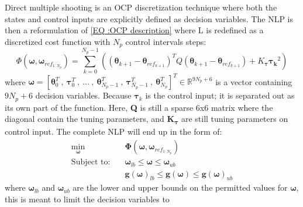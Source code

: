 Direct multiple shooting is an \gls{OCP} discretization technique where both the states and control inputs are explicitly defined as decision variables.
The \gls{NLP} is then a reformulation of \eqref{EQ :OCP description} where L is redefined as a discretized cost function with $N_p$ control intervals steps:
\begin{equation} %
    \Phi(\bm{\omega}, \bm{\omega}_{ref_{1:N_p}}) = 
    \sum_{k=0}^{N_{p}-1} ((\bm{\theta}_{k+1} - \bm{\theta}_{ref_{k+1}})^T Q (\bm{\theta}_{k+1} - \bm{\theta}_{ref_{k+1}}) + K_{\bm{\tau}} \bm{\tau_k}^2)
\end{equation}
where $\bm{\omega} = [\bm{\theta}_0^T \ , \ \bm{\tau}_0^T \ , \ ... \ , \ \bm{\theta}_{N_{p}-1}^T \ , \ \bm{\tau}_{N_{p}-1}^T \ , \ \bm{\theta}_{N_{p}}^T]^T \in \mathbb{R}^{9N_{p}+6}$
is a vector containing $9N_p + 6$ decision variables. %
Because $\bm{\tau}_k$ is the control input; it is separated out as its own part of the function. %
Here, \textbf{Q} is still a sparse 6x6 matrix where the diagonal contain the tuning parameters,
and \textbf{K}\textsubscript{$\bm{\tau}$} are still tuning parameters on control input. The complete NLP will end up in the form of:
\begin{subequations}
    \label{EQ:NLP}
    \begin{align}
        \min_{\bm{\omega}} \quad & \bm{\Phi}(\bm{\omega}, \bm{\omega}_{ref_{1:N_p}}) \\ %
        \textrm{Subject to:} \quad & \bm{\omega}_{lb} \leq \bm{\omega} \leq \bm{\omega}_{ub} \\
                            \quad & \textbf{g}(\bm{\omega})_{lb} \leq \textbf{g}(\bm{\omega}) \leq \textbf{g}(\bm{\omega})_{ub}
    \end{align}
\end{subequations}
where $\bm{\omega}_{lb}$ and $\bm{\omega}_{ub}$ are the lower and upper bounds on the permitted values for $\bm{\omega}$, this is meant to limit the decision variables to 

